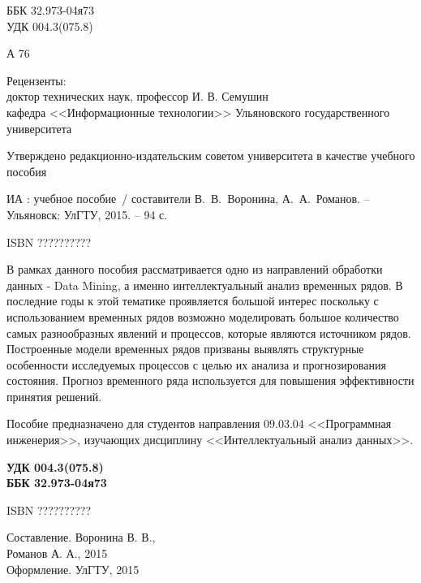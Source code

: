 \thispagestyle{empty}

\noindent
ББК 32.973-04я73\\
УДК 004.3(075.8)

\hangindent=0.7cm  \noindent
А 76
\vspace{0.8cm}

\hangindent=3.5cm  \noindent
Рецензенты:\\
доктор технических наук, профессор И. В. Семушин\\
кафедра <<Информационные технологии>> Ульяновского государственного университета

\vspace{0.6cm}
\begin{normalsize}
\noindent
Утверждено редакционно-издательским советом университета в качестве учебного пособия
\end{normalsize}

\vspace{0.6cm}
\noindent

ИА : учебное пособие~/
составители В.~В.~Воронина, А.~А.~Романов. -- Ульяновск: УлГТУ, 2015. -- 94 с.

ISBN ??????????

\begin{normalsize}
В рамках данного пособия рассматривается одно из направлений обработки данных - Data Mining,
а именно интеллектуальный анализ временных рядов. В последние годы к этой тематике проявляется большой
интерес поскольку с использованием временных рядов возможно моделировать большое количество самых 
разнообразных явлений и процессов, которые являются источником рядов. Построенные модели временных рядов
призваны выявлять структурные особенности исследуемых процессов с целью их анализа и прогнозирования состояния.
Прогноз временного ряда используется для повышения эффективности принятия решений.

Пособие предназначено для студентов направления 09.03.04 <<Программная инженерия>>, 
изучающих дисциплину <<Интеллектуальный анализ данных>>.
\end{normalsize}

\vspace{0.6cm}
\begin{flushright}
\textbf{УДК 004.3(075.8)}\\
\textbf{ББК 32.973-04я73}
\end{flushright}

\vfill

\noindent
\begin{minipage}{0.4\textwidth}
	ISBN ??????????
\end{minipage}
\hfill
\begin{minipage}{0.55\textwidth}
	\begin{flushright}
		\textcopyright{} Составление. Воронина В. В.,\\ Романов А. А., 2015\\
		\textcopyright{} Оформление. УлГТУ, 2015
	\end{flushright}
\end{minipage}